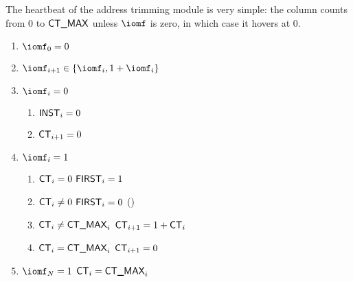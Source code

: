 The heartbeat of the address trimming module is very simple: the \ct{} column counts from $0$ to $\textsf{CT\_MAX}$ unless $\iomf$ is zero, in which case it hovers at $0$.
\begin{enumerate}
	\item $\iomf_{0} = 0$
	\item $\iomf_{i + 1} \in \{ \iomf_{i}, 1 + \iomf_{i} \}$
	\item \If $\iomf_{i} = 0$ \Then 
	\begin{enumerate}
    	\item $\textsf{INST}_{i}           = 0 $  
		\item $\textsf{CT}_{i+1}           = 0 $
	\end{enumerate}
	\item \If $\iomf_{i} = 1$ \Then
		\begin{enumerate}
		\item \If $\textsf{CT}_{i} =    0$ \Then $\textsf{FIRST}_{i} = 1$
		\item \If $\textsf{CT}_{i} \neq 0$ \Then $\textsf{FIRST}_{i} = 0$ (\trash)
		\item \If $\textsf{CT}_{i} \neq \textsf{CT\_MAX}_{i}$ \Then $\textsf{CT}_{i + 1} = 1 + \textsf{CT}_{i}$
		\item \If $\textsf{CT}_{i} = \textsf{CT\_MAX}_{i}$ \Then $\textsf{CT}_{i + 1} = 0$
		\end{enumerate}
	\item \If $\iomf_{N} = 1$ \Then $\textsf{CT}_{i} = \textsf{CT\_MAX}_{i}$
\end{enumerate}